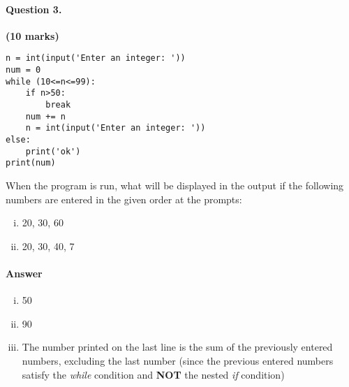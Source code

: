 \documentclass[12pt]{article}
\begin{document}
\paragraph{Question 3.}\hfill {\bf (10 marks)}
\\\begin{verbatim}
n = int(input('Enter an integer: '))
num = 0
while (10<=n<=99):
    if n>50:
        break
    num += n
    n = int(input('Enter an integer: '))
else:
    print('ok')
print(num)
\end{verbatim}
When the program is run, what will be displayed in the output if the following numbers are entered in the given order at the prompts:
\begin{enumerate}[(i)]
\item 20, 30, 60
\item 20, 30, 40, 7
\end{enumerate}
\paragraph{Answer}
\begin{enumerate}[(i)]
\item 50
\item 90
\item The number printed on the last line is the sum of the previously entered numbers, excluding the last number (since the previous entered numbers satisfy the \textit{while} condition and \textbf{NOT} the nested \textit{if} condition)
\end{enumerate}
\end{document}
